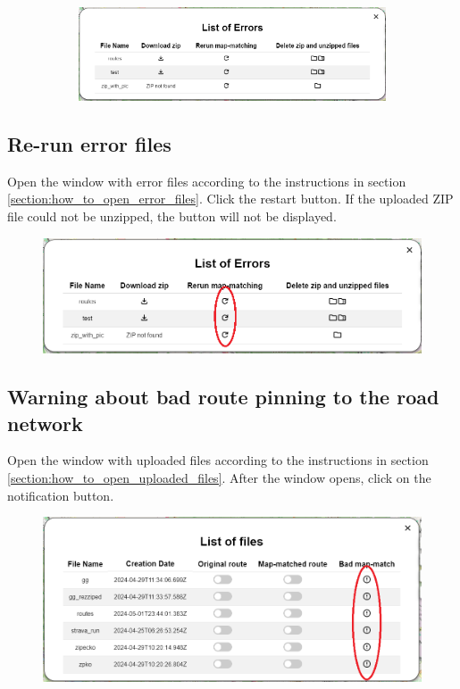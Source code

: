 \begin{figure}[H]
\begin{subfigure}{0.2\textwidth}
     \end{subfigure}
     \begin{subfigure}{.78\textwidth}
         \centering
         \includegraphics[width=1\textwidth]{guide_includes/img/errors.png}
     \end{subfigure}
\end{figure}

\subsection{Re-run error files}
Open the window with error files according to the instructions in section \ref{section:how_to_open_error_files}. Click the restart button. If the uploaded ZIP file could not be unzipped, the button will not be displayed.
\begin{figure}[H]
     \centering
     \includegraphics[width=1\textwidth]{guide_includes/img/rerun_map_match.png}
\end{figure}

\pagebreak
\subsection{Warning about bad route pinning to the road network}
Open the window with uploaded files according to the instructions in section \ref{section:how_to_open_uploaded_files}. After the window opens, click on the notification button.
\begin{figure}[H]
     \centering
     \includegraphics[width=1\textwidth]{guide_includes/img/bad_map_match_notify.png}
\end{figure}